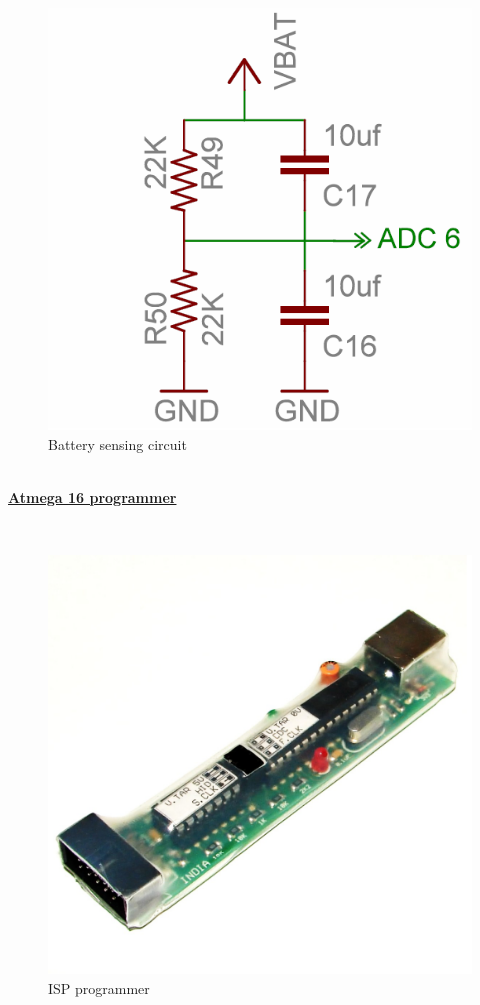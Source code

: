 \documentclass[a4paper,12pt,oneside]{book}
\begin{document}
	\hfill\\
	\begin{figure}[h!]
		\caption{Battery sensing circuit}
		\includegraphics[width=\textwidth]{./HardwareManual/battery_voltage_sensor.png}
	\end{figure}	
	\hfill\\
	\newpage
	\underline{\textbf{\Large{Atmega 16 programmer}}}
	
	\hfill\\
	\begin{figure}[h!]
		\caption{ISP programmer}
		\includegraphics[width=\textwidth]{./HardwareManual/ISP_programmer.png}
	\end{figure}	
	\hfill\\
	
\end{document}
